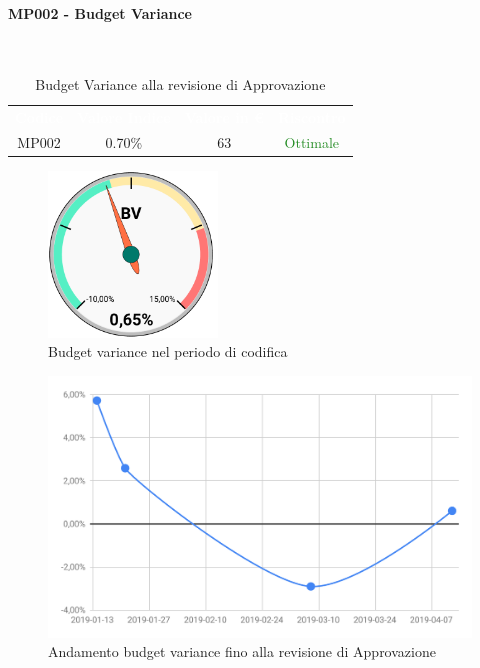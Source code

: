 \paragraph{MP002 - Budget Variance}\mbox{}\\[0,3cm]
    \begin{table}[H]
        \centering
        \begin{tabular}{cccc}
            \rowcolor{greySWEight}
            \textcolor{white}{\textbf{Codice}} &
            \textcolor{white}{\textbf{Valore Indice}}&
            \textcolor{white}{\textbf{Valore in €}}&
            \textcolor{white}{\textbf{Riscontro}}\\
            MP002 & 0.70\% & 63 & \textcolor{ForestGreen}{Ottimale}\\
        \end{tabular}
        \caption{Budget Variance alla revisione di Approvazione}
    \end{table}
    \begin{figure}[H]
        \centering
        \includegraphics[width=45mm]{sez/App_Esito/Approvazione/graph/budgetVarianceRA.pdf}
        \caption{Budget variance nel periodo di codifica}
    \end{figure}
    \begin{figure}[H]
        \centering
        \includegraphics[width=0.7\linewidth]{sez/App_Esito/Approvazione/graph/budgetVarianceRAStorico.pdf}
        \caption{Andamento budget variance fino alla revisione di Approvazione}
    \end{figure}
    \newpage